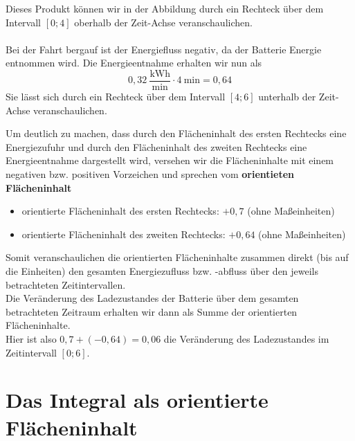 Dieses Produkt können wir in der Abbildung durch ein Rechteck über dem Intervall $[0;4]$ oberhalb der Zeit-Achse veranschaulichen.\\
\ \\

Bei der Fahrt bergauf ist der Energiefluss negativ, da der Batterie Energie entnommen wird. Die Energieentnahme erhalten wir nun als $$0,32 \ \frac{\text{kWh}}{\text{min}} \cdot 4 \ \text{min} = 0,64$$
Sie lässt sich durch ein Rechteck über dem Intervall $[4;6]$ unterhalb der Zeit-Achse veranschaulichen. 

Um deutlich zu machen, dass durch den Flächeninhalt des ersten Rechtecks eine Energiezufuhr und durch den Flächeninhalt des zweiten Rechtecks eine Energieentnahme dargestellt wird, versehen wir die Flächeninhalte mit einem negativen bzw. positiven Vorzeichen und sprechen vom \textbf{orientieten Flächeninhalt}
\begin{itemize}
    \item orientierte Flächeninhalt des ersten Rechtecks: $+0,7$ (ohne Maßeinheiten)
    \item orientierte Flächeninhalt des zweiten Rechtecks: $+0,64$ (ohne Maßeinheiten)
\end{itemize}
Somit veranschaulichen die orientierten Flächeninhalte zusammen direkt (bis auf die Einheiten) den gesamten Energiezufluss bzw. -abfluss über den jeweils betrachteten Zeitintervallen. \\
Die Veränderung des Ladezustandes der Batterie über dem gesamten betrachteten Zeitraum erhalten wir dann als Summe der orientierten Flächeninhalte. \\
Hier ist also $0,7 + (-0,64) = 0,06$ die Veränderung des Ladezustandes im Zeitintervall $[0;6]$.

\section{Das Integral als orientierte Flächeninhalt}
